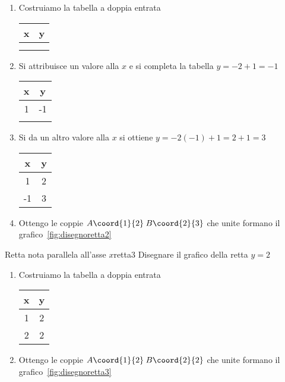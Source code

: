 \begin{enumerate}
	\item Costruiamo la tabella a doppia entrata 
	\begin{tabular}{c|c}
		x & y\\
		\hline 
		&  \\ 
		&  \\ 
	\end{tabular}
	\item Si attribuisce  un valore alla $x$ e si completa la tabella
	$y=-2+1=-1$
	\begin{tabular}{c|c}
		x & y\\
		\hline 
		1	& -1 \\ 
		&  \\ 
	\end{tabular}
	\item Si da un altro valore alla $x$ si ottiene 
	$y=-2(-1)+1=2+1=3$
	\begin{tabular}{c|c}
		x & y\\
		\hline 
		1	& 2 \\ 
		-1& 3 \\ 
	\end{tabular}
	\item Ottengo le coppie $A\coord{1}{2}$\,$B\coord{2}{3}$ che unite formano il grafico~\vref{fig:disegnoretta2}
\end{enumerate}
\begin{center}
	
	\label{fig:disegnoretta2}
\end{center}
\begin{esempiot}{Retta nota parallela all'asse $x$}{retta3}
	Disegnare il grafico della retta $y=2$
\end{esempiot}
\begin{enumerate}
	\item Costruiamo la tabella a doppia entrata 
	\begin{tabular}{c|c}
		x & y\\
		\hline 
		1&2\\ 
		2&2\\ 
	\end{tabular}
	\item Ottengo le coppie $A\coord{1}{2}$\,$B\coord{2}{2}$ che unite formano il grafico~\vref{fig:disegnoretta3}
\end{enumerate}
\begin{center}
	
	\label{fig:disegnoretta3}
\end{center}
